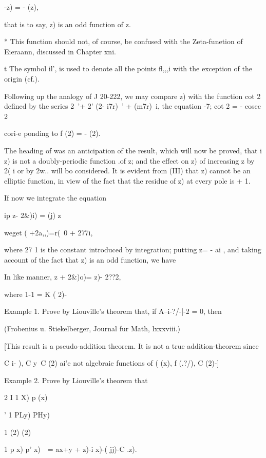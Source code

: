{  -z) = - (z),

that is to say, z) is an odd function of z.

* This function should not, of course, be confused with the
Zeta-funetion of Eieraann, discussed in Chapter xni.

t The symbol il', is used to denote all the points fl,,,i with the
exception of the origin (cf.).

%
%

Following up the analogy of J 20-222, we may compare z) with the
function cot 2 defined by the series 2~'+ 2' (2- i7r)~' + (m7r)~i,
the equation -7; cot 2 = - cosec 2

cori-e ponding to f (2) = - (2).


The heading of  was an anticipation of the result, which will
now be proved, that i z) is not a doubly-periodic function .of z; and
the effect on z) of increasing z by 2( i or by 2w.. will bo
considered. It is evident from  (III) that z) cannot be an
elliptic function, in view of the fact that the residue of z) at every
pole is + 1.

If now we integrate the equation

ip z- 2\&)i) = (j) z\

weget ( +2a,,)=r(~0 + 277i,

where 27 1 is the constant introduced by integration; putting z= - ai
, and taking account of the fact that z) is an odd function, we have

In like manner, z + 2\&)o)= z)- 2??2,

where 1-1 = K ( 2)-

Example 1. Prove by Liouville's theorem that, if A--i-?/-|-2 = 0, then

(Frobenius u. Stiekelberger, Journal fur Math, lxxxviii.)

[This result is a pseudo-addition theorem. It is not a true
addition-theorem since

C i- ), C y\ C (2) ai'e not algebraic functions of ( (x), f (.?/), C
(2)-]

Example 2. Prove by Liouville's theorem that

2 I 1 X) p (x)

' 1 PLy) PHy)

1 (2) (2)

1 p x) p' x)\ \ = ax+y + z)-i x)-( jj)-C .z).

}
